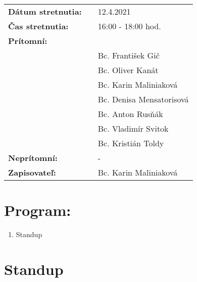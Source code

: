 \documentclass{article}
\begin{document}
    

    \begin{table}[h]
        \begin{tabular}{lllll}
            \multicolumn{3}{l}{\textbf{Dátum stretnutia:}} & & 12.4.2021 \\
            \multicolumn{3}{l}{\textbf{Čas stretnutia:}} & & 16:00 - 18:00 hod. \\
            \multicolumn{3}{l}{\textbf{Prítomní:}} \\
            & & & & Bc. František Gič  \\
            & & & & Bc. Oliver Kanát \\
            & & & & Bc. Karin Maliniaková \\
            & & & & Bc. Denisa Mensatorisová \\
            & & & & Bc. Anton Rusňák \\
            & & & & Bc. Vladimír Svitok \\
            & & & & Bc. Kristián Toldy \\
            \multicolumn{3}{l}{\textbf{Neprítomní:}} & & -\\
            \multicolumn{3}{l}{\textbf{Zapisovateľ:}} & & Bc. Karin Maliniaková \\
        \end{tabular}
        \label{tab:grades}
    \end{table}

    \section*{Program:}

    \begin{enumerate}
        \item Standup
    \end{enumerate}

    \section*{Standup}
\end{document}

